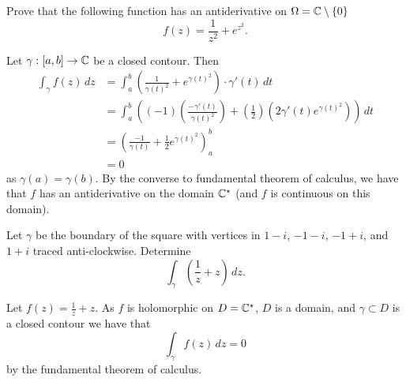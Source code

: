 \question Prove that the following function has an antiderivative on
$\Omega = \mathbb{C}\setminus\{0\}$
\[
    f(z) = \frac{1}{z^2} + e^{z^2}.
\]
\begin{solution}
    Let $\gamma: [a,b] \to \mathbb{C}$ be a closed contour.
    Then
    \begin{align*}
        \int_\gamma f(z) \,dz
        &= \int_a^b \left(\frac{1}{\gamma(t)^2} + e^{\gamma(t)^2}\right) \cdot \gamma'(t) \,dt \\
        &= \int_a^b \left((-1)\left(\frac{-\gamma'(t)}{\gamma(t)^2}\right) + 
            \left(\frac12\right)\left(2\gamma'(t) e^{\gamma(t)^2}\right) \right) \,dt \\
        &= \left(\frac{-1}{\gamma(t)} + \frac12 e^{\gamma(t)^2}\right)^b_a \\
        &= 0
    \end{align*}
    as $\gamma(a) = \gamma(b)$.
    By the converse to fundamental theorem of calculus, we have that $f$ has an antiderivative
    on the domain $\mathbb{C}^\star$ (and $f$ is continuous on this domain).
\end{solution}

\question Let $\gamma$ be the boundary of the square with vertices in 
$1-i$, $-1-i$, $-1+i$, and $1+i$ traced anti-clockwise.
Determine
\[
    \int_\gamma \left(\frac1z + z\right) \,dz.
\]
\begin{solution}
    Let $f(z) = \frac1z + z$. As $f$ is holomorphic on $D = \mathbb{C}^\star$,
    $D$ is a domain, and $\gamma \subset D$ is a closed contour we have that
    \[
        \int_\gamma f(z) \,dz = 0
    \]
    by the fundamental theorem of calculus.
\end{solution}
